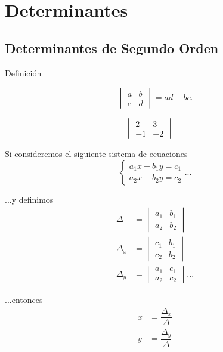 
\section{Determinantes}

\subsection{Determinantes de Segundo Orden}

{Definición}
	\begin{definicion}
		$$
		\begin{vmatrix}
			a & b \\ c & d
		\end{vmatrix}=ad-bc.
		$$
	\end{definicion}
	



	\begin{problema}
		$$
		\begin{vmatrix} 2 & 3 \\ -1 & -2 \end{vmatrix}=
		$$
	\end{problema}
	



	Si consideremos el siguiente sistema de ecuaciones
	\[
		\begin{cases}
			a_{1}x+b_{1}y=c_{1}\\
			a_{2}x+b_{2}y=c_{2}
		\end{cases}...
	\]
	



	...y definimos
	\begin{align*}
		\Delta&=\begin{vmatrix} a_{1} & b_{1} \\ a_{2} & b_{2} \end{vmatrix}\\
		\Delta_{x}&=\begin{vmatrix} c_{1} & b_{1} \\ c_{2} & b_{2} \end{vmatrix}\\
		\Delta_{y}&=\begin{vmatrix} a_{1} & c_{1} \\ a_{2} & c_{2} \end{vmatrix}...
	\end{align*}



	...entonces
	\[
		\label{spi:28.2}
		\begin{split}
			x&=\dfrac{\Delta_{x}}{\Delta}\\
			y&=\dfrac{\Delta_{y}}{\Delta}
		\end{split}
	\]
	



